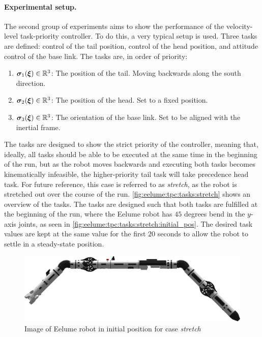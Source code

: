 \paragraph{Experimental setup.}
The second group of experiments aims to show the performance of the velocity-level
task-priority controller. To do this, a very typical setup is used.
Three tasks are defined: control of the tail position, control of the head position, and attitude control of the base link.
The tasks are, in order of priority:
\begin{enumerate}
    \item \(\bm{\sigma}_1(\bm{\xi}) \in \mathbb{R}^3\): The position of the tail. Moving backwards along the south direction.
    \item \(\bm{\sigma}_2(\bm{\xi}) \in \mathbb{R}^3\): The position of the head. Set to a fixed position.
    \item \(\bm{\sigma}_3(\bm{\xi}) \in \mathbb{R}^3\): The orientation of the base link. Set to be aligned with the inertial frame.
\end{enumerate}
The tasks are designed to
show the strict priority of the controller, meaning that, ideally, all tasks
should be able to be executed at the same time in the beginning of the run, but
as the robot moves backwards and executing both tasks becomes kinematically infeasible,
the higher-priority tail task will take precedence head task. For future reference, this
case is referred to as \textit{stretch}, as the robot is stretched out over
the course of the run. \autoref{fig:eelume:tpc:tasks:stretch} shows an overview of the tasks.
The tasks are designed such that both tasks are fulfilled at the beginning of the run,
where the Eelume robot has \(45\) degrees bend in the \(y\)-axis joints, as
seen in \autoref{fig:eelume:tpc:tasks:stretch:initial_pos}. The desired task values
are kept at the same value for the first \(20\) seconds to allow the robot to settle
in a steady-state position.

\begin{figure}[!ht]
    \centering
    \includegraphics[width=\textwidth]{assets/side-view-45-joints.png}
    \caption{Image of Eelume robot in initial position for case \textit{stretch}}
    \label{fig:eelume:tpc:tasks:stretch:initial_pos}
\end{figure}

